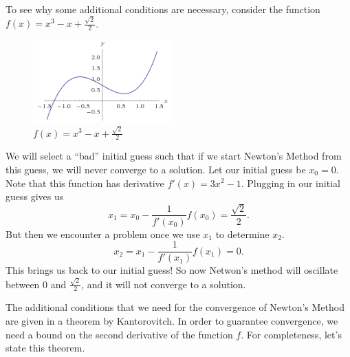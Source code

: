 \documentclass[twoside,letterpaper,11pt]{article}
\numberwithin{equation}{section}
\begin{document}
To see why some additional conditions are necessary, consider the function $f(x)
= x^3 - x + \frac{\sqrt{2}}{2}$.
\begin{figure}
  \begin{center}
    \includegraphics[width=0.48\textwidth]{newtonfail}
  \end{center}
  \caption{$f(x) = x^3 - x + \frac{\sqrt{2}}{2}$}
\end{figure}
We will select a ``bad'' initial guess such that if we start Newton's Method
from this guess, we will never converge to a solution.
Let our initial guess be $x_0 = 0$.
Note that this function has derivative $f'(x) = 3x^2 - 1$.
Plugging in our initial guess gives us
\begin{equation*}
  x_1 = x_0 - \frac{1}{f'(x_0)} f(x_0) = \frac{\sqrt{2}}{2}.
\end{equation*}
But then we encounter a problem once we use $x_1$ to determine $x_2$.
\begin{equation*}
  x_2 = x_1 - \frac{1}{f'(x_1)} f(x_1) = 0.
\end{equation*}
This brings us back to our initial guess!
So now Netwon's method will oscillate between $0$ and $\frac{\sqrt{2}}{2}$, and
it will not converge to a solution.

The additional conditions that we need for the convergence of Newton's Method
are given in a theorem by Kantorovitch.
In order to guarantee convergence, we need a bound on the second derivative of
the function $f$.
For completeness, let's state this theorem.
\end{document}
